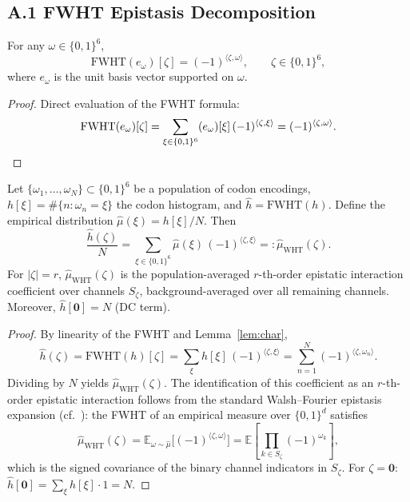 \documentclass[11pt]{article}
\begin{document}
\subsection*{A.1 \quad FWHT Epistasis Decomposition}

\begin{lemma}\label{lem:char}
For any $\omega \in \{0,1\}^6$,
\[
  \mathrm{FWHT}(e_\omega)[\zeta]
  = (-1)^{\langle \zeta,\omega\rangle}, \qquad \zeta \in \{0,1\}^6,
\]
where $e_\omega$ is the unit basis vector supported on $\omega$.
\end{lemma}

\begin{proof}
Direct evaluation of the FWHT formula:
\[
  \mathrm{FWHT}(e_\omega)[\zeta]
  = \sum_{\xi \in \{0,1\}^6} (e_\omega)[\xi]\,(-1)^{\langle \zeta,\xi\rangle}
  = (-1)^{\langle \zeta,\omega\rangle}. \qedhere
\]
\end{proof}

\begin{theorem}\label{thm:epistasis}
Let $\{\omega_1,\ldots,\omega_N\} \subset \{0,1\}^6$ be a population of
codon encodings, $h[\xi] = \#\{n : \omega_n = \xi\}$ the codon histogram,
and $\hat{h} = \mathrm{FWHT}(h)$.  Define the empirical distribution
$\hat{\mu}(\xi) = h[\xi]/N$.  Then
\[
  \frac{\hat{h}(\zeta)}{N}
  = \sum_{\xi \in \{0,1\}^6} \hat{\mu}(\xi)\,(-1)^{\langle \zeta,\xi\rangle}
  =: \hat{\mu}_{\mathrm{WHT}}(\zeta).
\]
For $|\zeta|=r$, $\hat{\mu}_{\mathrm{WHT}}(\zeta)$ is the
population-averaged $r$-th-order epistatic interaction coefficient over
channels $S_\zeta$, background-averaged over all remaining channels.
Moreover, $\hat{h}[\bm{0}] = N$ (DC term).
\end{theorem}

\begin{proof}
By linearity of the FWHT and Lemma~\ref{lem:char},
\[
  \hat{h}(\zeta)
  = \mathrm{FWHT}(h)[\zeta]
  = \sum_\xi h[\xi]\,(-1)^{\langle \zeta,\xi\rangle}
  = \sum_{n=1}^N (-1)^{\langle \zeta,\omega_n\rangle}.
\]
Dividing by $N$ yields $\hat{\mu}_{\mathrm{WHT}}(\zeta)$.  The identification
of this coefficient as an $r$-th-order epistatic interaction follows from
the standard Walsh--Fourier epistasis expansion
(cf.\ \cite{weekes2024wht}): the FWHT of an empirical measure over
$\{0,1\}^d$ satisfies
\[
  \hat{\mu}_{\mathrm{WHT}}(\zeta)
  = \mathbb{E}_{\omega \sim \hat{\mu}}\bigl[(-1)^{\langle \zeta,\omega\rangle}\bigr]
  = \mathbb{E}\!\left[\prod_{k\in S_\zeta}(-1)^{\omega_k}\right],
\]
which is the signed covariance of the binary channel indicators in
$S_\zeta$.  For $\zeta = \bm{0}$:
$\hat{h}[\bm{0}] = \sum_\xi h[\xi] \cdot 1 = N$.
\end{proof}
\end{document}
